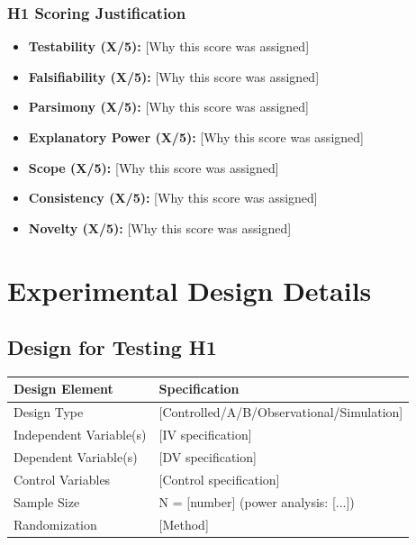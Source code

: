 \documentclass[11pt,a4paper]{article}
\begin{document}
\subsubsection*{H1 Scoring Justification}
\begin{itemize}
    \item \textbf{Testability (X/5):} [Why this score was assigned]
    \item \textbf{Falsifiability (X/5):} [Why this score was assigned]
    \item \textbf{Parsimony (X/5):} [Why this score was assigned]
    \item \textbf{Explanatory Power (X/5):} [Why this score was assigned]
    \item \textbf{Scope (X/5):} [Why this score was assigned]
    \item \textbf{Consistency (X/5):} [Why this score was assigned]
    \item \textbf{Novelty (X/5):} [Why this score was assigned]
\end{itemize}

\newpage

\section{Experimental Design Details}

\subsection*{Design for Testing H1}

\begin{center}
\begin{tabular}{ll}
\toprule
\textbf{Design Element} & \textbf{Specification} \\
\midrule
Design Type & [Controlled/A/B/Observational/Simulation] \\
Independent Variable(s) & [IV specification] \\
Dependent Variable(s) & [DV specification] \\
Control Variables & [Control specification] \\
Sample Size & N = [number] (power analysis: [...]) \\
Randomization & [Method] \\
\bottomrule
\end{tabular}
\end{center}
\end{document}
